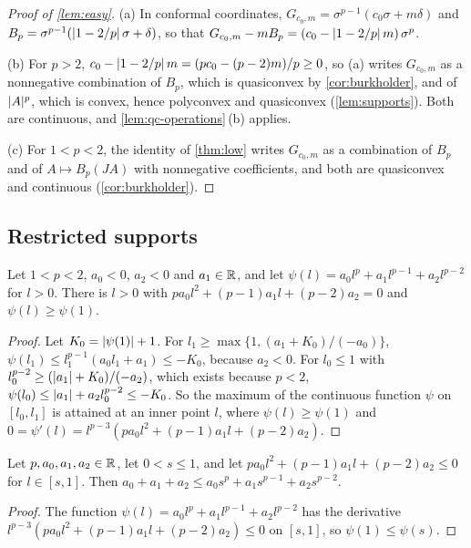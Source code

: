 \begin{proof}[Proof of \cref{lem:easy}]
(a) In conformal coordinates, $G_{c_0,m}=\sigma^{p-1}(c_0\sigma+m\delta)$ and
$B_p=\sigma^{p-1}(\lvert 1-2/p\rvert\,\sigma+\delta)$, so that
$G_{c_0,m}-mB_p=(c_0-\lvert 1-2/p\rvert\,m)\,\sigma^p$.

(b) For $p>2$, $c_0-\lvert 1-2/p\rvert\,m=(pc_0-(p-2)m)/p\ge0$, so (a) writes $G_{c_0,m}$ as a
nonnegative combination of $B_p$, which is quasiconvex by \cref{cor:burkholder}, and of
$\lvert A\rvert^p$, which is convex, hence polyconvex and quasiconvex (\cref{lem:supports}). Both are
continuous, and \cref{lem:qc-operations}\,(b) applies.

(c) For $1<p<2$, the identity of \cref{thm:low} writes $G_{c_0,m}$ as a combination of $B_p$
and of $A\mapsto B_p(JA)$ with nonnegative coefficients, and both are quasiconvex and continuous
(\cref{cor:burkholder}).
\end{proof}

\subsection{Restricted supports}

\begin{lemma}\label{lem:psi-low}
Let $1<p<2$, $a_0<0$, $a_2<0$ and $a_1\in\mathbb{R}$, and let $\psi(l)=a_0l^p+a_1l^{p-1}+a_2l^{p-2}$
for $l>0$. There is $l>0$ with $pa_0l^2+(p-1)a_1l+(p-2)a_2=0$ and $\psi(l)\ge\psi(1)$.
\end{lemma}

\begin{proof}
Let $K_0=\lvert \psi(1)\rvert+1$. For $l_1\ge\max\{1,(a_1+K_0)/(-a_0)\}$,
$\psi(l_1)\le l_1^{p-1}(a_0l_1+a_1)\le-K_0$, because $a_2<0$. For $l_0\le1$ with
$l_0^{p-2}\ge(\lvert a_1\rvert+K_0)/(-a_2)$, which exists because $p<2$,
$\psi(l_0)\le\lvert a_1\rvert+a_2l_0^{p-2}\le-K_0$. So the maximum of the continuous function $\psi$
on $[l_0,l_1]$ is attained at an inner point $l$, where $\psi(l)\ge\psi(1)$ and
$0=\psi'(l)=l^{p-3}(pa_0l^2+(p-1)a_1l+(p-2)a_2)$.
\end{proof}

\begin{lemma}\label{lem:decreasing}
Let $p,a_0,a_1,a_2\in\mathbb{R}$, let $0<s\le1$, and let $pa_0l^2+(p-1)a_1l+(p-2)a_2\le0$ for
$l\in[s,1]$. Then $a_0+a_1+a_2\le a_0s^p+a_1s^{p-1}+a_2s^{p-2}$.
\end{lemma}

\begin{proof}
The function $\psi(l)=a_0l^p+a_1l^{p-1}+a_2l^{p-2}$ has the derivative
$l^{p-3}(pa_0l^2+(p-1)a_1l+(p-2)a_2)\le0$ on $[s,1]$, so $\psi(1)\le\psi(s)$.
\end{proof}

